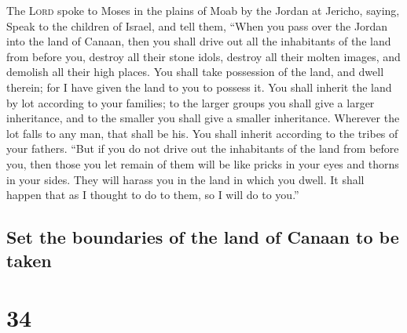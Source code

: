  The \textsc{Lord} spoke to Moses in the plains of Moab
by the Jordan at Jericho, saying,  Speak to the children
of Israel, and tell them, ``When you pass over the Jordan into the land
of Canaan,  then you shall drive out all the inhabitants
of the land from before you, destroy all their stone idols, destroy all
their molten images, and demolish all their high places. 
You shall take possession of the land, and dwell therein; for I have
given the land to you to possess it.  You shall inherit
the land by lot according to your families; to the larger groups you
shall give a larger inheritance, and to the smaller you shall give a
smaller inheritance. Wherever the lot falls to any man, that shall be
his. You shall inherit according to the tribes of your fathers.
 ``But if you do not drive out the inhabitants of the
land from before you, then those you let remain of them will be like
pricks in your eyes and thorns in your sides. They will harass you in
the land in which you dwell.  It shall happen that as I
thought to do to them, so I will do to you.''

\hypertarget{set-the-boundaries-of-the-land-of-canaan-to-be-taken}{%
\subsection{Set the boundaries of the land of Canaan to be
taken}\label{set-the-boundaries-of-the-land-of-canaan-to-be-taken}}

\hypertarget{section-33}{%
\section{34}\label{section-33}}

